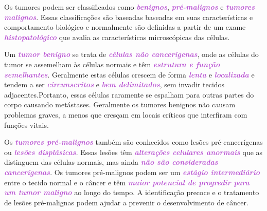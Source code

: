 \documentclass[11pt,a4paper]{article}
\begin{document}
    Os tumores podem ser classificados como \textcolor{MediumOrchid}{\textbf{\textit{benignos}}}, \textcolor{MediumOrchid}{\textbf{\textit{pré-malignos}}} e \textcolor{MediumOrchid}{\textbf{\textit{tumores malignos}}}. Essas classificações são baseadas baseadas em suas características e comportamento biológico e normalmente são definidas a partir de um exame \textcolor{MediumOrchid}{\textbf{\textit{histopatológico}}} que avalia as características microscópicas das células.

    Um \textcolor{MediumOrchid}{\textbf{\textit{tumor benigno}}} se trata de \textcolor{MediumOrchid}{\textbf{\textit{células não cancerígenas}}}, onde as células do tumor se assemelham às células normais e têm \textcolor{MediumOrchid}{\textbf{\textit{estrutura e função semelhantes}}}. Geralmente estas células crescem de forma \textcolor{MediumOrchid}{\textbf{\textit{lenta}}} e \textcolor{MediumOrchid}{\textbf{\textit{localizada}}} e tendem a ser \textcolor{MediumOrchid}{\textbf{\textit{circunscritos}}} e \textcolor{MediumOrchid}{\textbf{\textit{bem delimitados}}}, sem invadir tecidos adjacentes.Portanto, essas células raramente se espalham para outras partes do corpo causando metástases. Geralmente os tumores benignos não causam problemas graves, a menos que cresçam em locais críticos que interfiram com funções vitais.

    \begin{figure}
        \centering
    \end{figure}

    Os \textcolor{MediumOrchid}{\textbf{\textit{tumores pré-malignos}}} também são conhecidos como lesões pré-cancerígenas ou \textcolor{MediumOrchid}{\textbf{\textit{lesões displásicas}}}. Essas lesões têm \textcolor{MediumOrchid}{\textbf{\textit{alterações celulares anormais}}} que as distinguem das células normais, mas ainda \textcolor{MediumOrchid}{\textbf{\textit{não são consideradas cancerígenas}}}. Os tumores pré-malignos podem ser um \textcolor{MediumOrchid}{\textbf{\textit{estágio intermediário}}} entre o tecido normal e o câncer e têm \textcolor{MediumOrchid}{\textbf{\textit{maior potencial de progredir para um tumor maligno}}} ao longo do tempo. A identificação precoce e o tratamento de lesões pré-malignas podem ajudar a prevenir o desenvolvimento de câncer.
\end{document}
